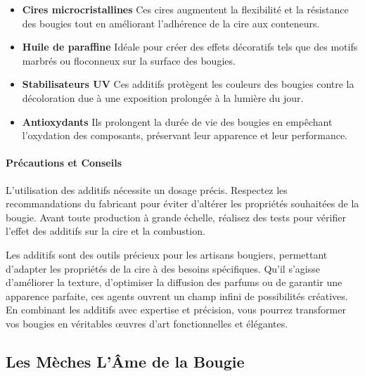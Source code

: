 \documentclass[11pt,fleqn,onecolumn,oneside]{book}
\begin{document}
\begin{itemize}
    \item \textbf{Cires microcristallines} Ces cires augmentent la flexibilité et la résistance des bougies tout en améliorant l’adhérence de la cire aux conteneurs.
    \item \textbf{Huile de paraffine} Idéale pour créer des effets décoratifs tels que des motifs marbrés ou floconneux sur la surface des bougies.
    \item \textbf{Stabilisateurs UV} Ces additifs protègent les couleurs des bougies contre la décoloration due à une exposition prolongée à la lumière du jour.
    \item \textbf{Antioxydants} Ils prolongent la durée de vie des bougies en empêchant l’oxydation des composants, préservant leur apparence et leur performance.
\end{itemize}

\paragraph{Précautions et Conseils}

\begin{remark}
L’utilisation des additifs nécessite un dosage précis. Respectez les recommandations du fabricant pour éviter d’altérer les propriétés souhaitées de la bougie. Avant toute production à grande échelle, réalisez des tests pour vérifier l’effet des additifs sur la cire et la combustion.
\end{remark}

\begin{corollary}
Les additifs sont des outils précieux pour les artisans bougiers, permettant d’adapter les propriétés de la cire à des besoins spécifiques. Qu’il s’agisse d’améliorer la texture, d’optimiser la diffusion des parfums ou de garantir une apparence parfaite, ces agents ouvrent un champ infini de possibilités créatives. En combinant les additifs avec expertise et précision, vous pourrez transformer vos bougies en véritables œuvres d’art fonctionnelles et élégantes.
\end{corollary}

\subsection*{Les Mèches L’Âme de la Bougie}
\end{document}
